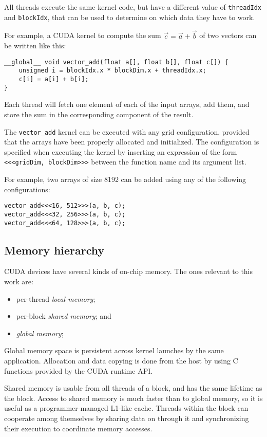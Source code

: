 All threads execute the same kernel code,
but have a different value of \verb+threadIdx+ and \verb+blockIdx+,
that can be used to determine on which data they have to work.

For example,
a CUDA kernel to compute the sum \(\vec c = \vec a + \vec b\) of two vectors
can be written like this:
\begin{verbatim}
__global__ void vector_add(float a[], float b[], float c[]) {
    unsigned i = blockIdx.x * blockDim.x + threadIdx.x;
    c[i] = a[i] + b[i];
}
\end{verbatim}
Each thread will fetch one element of each of the input arrays, add them,
and store the sum in the corresponding component of the result.

The \verb+vector_add+ kernel can be executed with any grid configuration,
provided that the arrays have been properly allocated and initialized.
The configuration is specified when executing the kernel
by inserting an expression of the form \texttt{<<<gridDim, blockDim>>>}
between the function name and its argument list.

For example,
two arrays of size 8192 can be added using any of the following configurations:
\begin{verbatim}
vector_add<<<16, 512>>>(a, b, c);
vector_add<<<32, 256>>>(a, b, c);
vector_add<<<64, 128>>>(a, b, c);
\end{verbatim}

\subsection{Memory hierarchy}
\label{sub:memory-hierarchy}

CUDA devices have several kinds of on-chip memory.
The ones relevant to this work are:
\begin{itemize}
  \item per-thread \emph{local memory};
  \item per-block \emph{shared memory}; and
  \item \emph{global memory};
\end{itemize}

Global memory space is persistent across kernel launches
by the same application.
Allocation and data copying is done from the host
by using C functions provided by the CUDA runtime API.

Shared memory is usable from all threads of a block,
and has the same lifetime as the block.
Access to shared memory is much faster than to global memory,
so it is useful as a programmer-managed L1-like cache.
Threads within the block can cooperate among themselves
by sharing data on through it and synchronizing their execution
to coordinate memory accesses.

